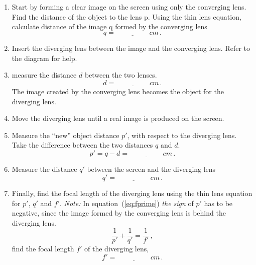 \documentclass[11pt, a4paper]{article}
\begin{document}
\begin{enumerate}
    \item Start by forming a clear image on the screen using only the converging lens. Find the distance of the object to the lens p.
        Using the thin lens equation, calculate distance of the image q formed by the converging lens
        \begin{equation*}
            q = \underline{\hspace{2cm}} \si{cm}\,.
        \end{equation*}

    \item Insert the diverging lens between the image and the converging lens. Refer to the diagram for help.\\
    \item measure the distance $d$ between the two lenses.
        \begin{equation*}
            d = \underline{\hspace{2cm}} \si{cm}\,.
        \end{equation*}
        The image created by the converging lens becomes the object for the diverging lens.
    \item Move the diverging lens until a real image is produced on the screen.
    \item Measure the ``new'' object distance $p'$, with respect to the diverging lens. Take the difference between the two distances $q$ and $d$.
        \begin{equation*}
            p' = q - d  = \underline{\hspace{2cm}} \si{cm}\,.
        \end{equation*}
    \item Measure the distance $q'$ between the screen and the diverging lens
        \begin{equation*}
            q'  = \underline{\hspace{2cm}} \si{cm}\,.
        \end{equation*}
    \item Finally, find the focal length of the diverging lens using the thin lens equation for $p'$, $q'$ and $f'$.
        \textit{Note:} In equation~(\ref{eq:fprime}) \textit{the sign} of $p'$ has to be negative, since the image formed by the converging lens is behind the diverging lens.
        \begin{equation}
            \frac{1}{p'} + \frac{1}{q'} = \frac{1}{f'}\,,
            \label{eq:fprime}
        \end{equation}
        find the focal length $f'$ of the diverging lens,
        \begin{equation*}
            f'  = \underline{\hspace{2cm}} \si{cm}\,.
        \end{equation*}
\end{enumerate}
\end{document}
